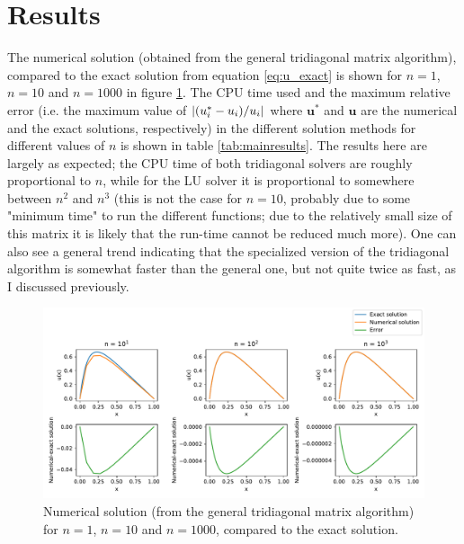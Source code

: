 \documentclass[a4paper,english]{article}
\renewcommand\vec{\mathbf}
\newcommand\norm[1]{\left\lvert#1\right\rvert}
\let\originalleft\left
\let\originalright\right
\renewcommand{\left}{\mathopen{}\mathclose\bgroup\originalleft}
\renewcommand{\right}{\aftergroup\egroup\originalright}
\begin{document}
\section{Results}
The numerical solution (obtained from the general tridiagonal matrix algorithm), compared to the exact solution from equation \ref{eq:u_exact} is shown for $n=1$, $n=10$ and $n=1000$ in figure \ref{fig:general_plot}. The CPU time used and the maximum relative error (i.e. the maximum value of $\norm{\left(u^*_i-u_i\right)/u_i}$ where $\vec{u}^*$ and $\vec{u}$ are the numerical and the exact solutions, respectively) in the different solution methods for different values of $n$ is shown in table \ref{tab:mainresults}. The results here are largely as expected; the CPU time of both tridiagonal solvers are roughly proportional to $n$, while for the LU solver it is proportional to somewhere between $n^2$ and $n^3$ (this is not the case for $n=10$, probably due to some "minimum time" to run the different functions; due to the relatively small size of this matrix it is likely that the run-time cannot be reduced much more). One can also see a general trend indicating that the specialized version of the tridiagonal algorithm is somewhat faster than the general one, but not quite twice as fast, as I discussed previously. \par
\begin{figure}[ht]
  \centering
  \includegraphics[width=0.96\linewidth]{general_plot.pdf}
  \caption{Numerical solution (from the general tridiagonal matrix algorithm) for $n=1$, $n=10$ and $n=1000$, compared to the exact solution.}
  \label{fig:general_plot}
\end{figure}
\end{document}

